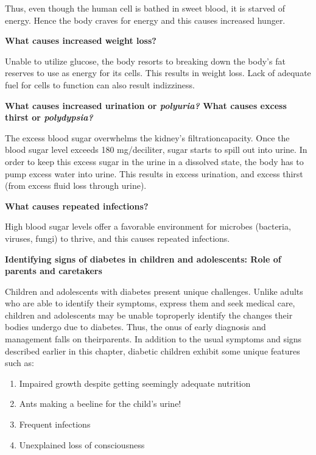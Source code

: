 Thus, even though the human cell is bathed in sweet blood, it is starved of energy. Hence the body craves for energy and this causes increased hunger.

\noindent
\textbf{What causes increased weight loss?}

Unable to utilize glucose, the body resorts to breaking down the body’s fat reserves to use as energy for its cells. This results in weight loss. Lack of adequate fuel for cells to function can also result in\break dizziness.

\noindent
\textbf{What causes increased urination or \textit{polyuria?} What causes excess thirst or \textit{polydypsia?}}

The excess blood sugar overwhelms the kidney’s filtration\break capa\-city. Once the blood sugar level exceeds 180 mg/deciliter, sugar starts to spill out into urine. In order to keep this excess sugar in the urine in a dissolved state, the body has to pump excess water into urine. This results in excess urination, and excess thirst (from excess fluid loss through urine).

\noindent
\textbf{What causes repeated infections?}

High blood sugar levels offer a favorable environment for microbes (bacteria, viruses, fungi) to thrive, and this causes repeated infections.

\noindent
\textbf{Identifying signs of diabetes in children and adolescents: Role of parents and caretakers}

Children and adolescents with diabetes present unique challenges. Unlike adults who are able to identify their symptoms, express them and seek medical care, children and adolescents may be unable to\break pro\-perly identify the changes their bodies undergo due to diabetes. Thus, the onus of early diagnosis and management falls on their\break parents. In addition to the usual symptoms and signs described earlier in this chapter, diabetic children exhibit some unique features such as:

\vspace{-\topsep}
\begin{enumerate}[\ding{226}]
\itemsep=0pt
\item Impaired growth despite getting seemingly adequate nutrition
\item Ants making a beeline for the child’s urine!
\item Frequent infections
\item Unexplained loss of consciousness
\end{enumerate}
\vspace{-\topsep}

